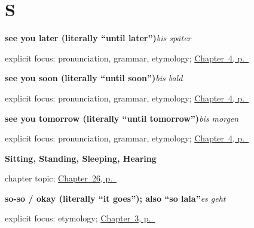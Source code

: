 \section*{S}

\noindent\begin{minipage}[t]{\linewidth}
\raggedright
\textbf{see you later (literally \textquotedblleft{}until later\textquotedblright{})}\enspace\emph{bis später}\par
\footnotesize explicit focus: pronunciation, grammar, etymology; \hyperref[ch:farewells]{Chapter~4, p.~\pageref*{ch:farewells}}
\end{minipage}\par\smallskip

\noindent\begin{minipage}[t]{\linewidth}
\raggedright
\textbf{see you soon (literally \textquotedblleft{}until soon\textquotedblright{})}\enspace\emph{bis bald}\par
\footnotesize explicit focus: pronunciation, grammar, etymology; \hyperref[ch:farewells]{Chapter~4, p.~\pageref*{ch:farewells}}
\end{minipage}\par\smallskip

\noindent\begin{minipage}[t]{\linewidth}
\raggedright
\textbf{see you tomorrow (literally \textquotedblleft{}until tomorrow\textquotedblright{})}\enspace\emph{bis morgen}\par
\footnotesize explicit focus: pronunciation, grammar, etymology; \hyperref[ch:farewells]{Chapter~4, p.~\pageref*{ch:farewells}}
\end{minipage}\par\smallskip

\noindent\begin{minipage}[t]{\linewidth}
\raggedright
\textbf{Sitting, Standing, Sleeping, Hearing}\par
\footnotesize chapter topic; \hyperref[ch:ge-still-verbs]{Chapter~26, p.~\pageref*{ch:ge-still-verbs}}
\end{minipage}\par\smallskip

\noindent\begin{minipage}[t]{\linewidth}
\raggedright
\textbf{so-so / okay (literally \textquotedblleft{}it goes\textquotedblright{}); also \textquotedblleft{}so lala\textquotedblright{}}\enspace\emph{es geht}\par
\footnotesize explicit focus: etymology; \hyperref[ch:how-are-you]{Chapter~3, p.~\pageref*{ch:how-are-you}}
\end{minipage}\par\smallskip

